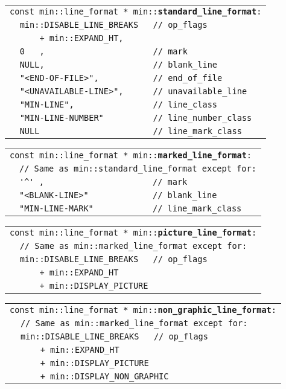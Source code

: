 \documentclass[12pt]{article}
\makeatletter
\newcommand{\TT}[1]{{\tt \bfseries #1}}
\newcommand{\ttindex}[1]{\index{#1@{\tt #1}}}
\newenvironment{indpar}[1][0.3in]%
	{\begin{list}{}%
		     {\setlength{\itemsep}{0in}%
		      \setlength{\topsep}{0in}%
		      \setlength{\parsep}{1ex}%
		      \setlength{\labelwidth}{#1}%
		      \setlength{\leftmargin}{#1}%
		      \addtolength{\leftmargin}{\labelsep}}%
	 \item}%
	{\end{list}}
\newcommand{\LABEL}[1]{\label{#1}}
\newlength{\ARGBREAKLENGTH}
\newcommand{\ARGBREAK}[1][\ARGBREAKLENGTH]{\\&\hspace*{#1}}
\newcommand{\MINKEY}[1]%
	   {\TT{#1}\ttindex{min::#1}\ttindex{#1}}
\makeatother
\begin{document}
\begin{indpar}[1em]\begin{tabular}{rl}
\multicolumn{2}{l}{\tt const min::line\_format *
    min::\MINKEY{standard\_line\_format}:}
\LABEL{MIN::STANDARD_LINE_FORMAT}\ARGBREAK
\verb|min::DISABLE_LINE_BREAKS   // op_flags|\ARGBREAK
\verb|    + min::EXPAND_HT,|\ARGBREAK
\verb|0   ,                      // mark|\ARGBREAK
\verb|NULL,                      // blank_line|\ARGBREAK
\verb|"<END-OF-FILE>",           // end_of_file|\ARGBREAK
\verb|"<UNAVAILABLE-LINE>",      // unavailable_line|\ARGBREAK
\verb|"MIN-LINE",                // line_class|\ARGBREAK
\verb|"MIN-LINE-NUMBER"          // line_number_class|\ARGBREAK
\verb|NULL                       // line_mark_class|
\end{tabular}\end{indpar}

\begin{indpar}[1em]\begin{tabular}{rl}
\multicolumn{2}{l}{\tt const min::line\_format *
    min::\MINKEY{marked\_line\_format}:}
\LABEL{MIN::MARKED_LINE_FORMAT}\ARGBREAK
\verb|// Same as min::standard_line_format except for:|\ARGBREAK
\verb|'^' ,                      // mark|\ARGBREAK
\verb|"<BLANK-LINE>"             // blank_line|\ARGBREAK
\verb|"MIN-LINE-MARK"            // line_mark_class|
\end{tabular}\end{indpar}

\begin{indpar}[1em]\begin{tabular}{rl}
\multicolumn{2}{l}{\tt const min::line\_format *
    min::\MINKEY{picture\_line\_format}:}
\LABEL{MIN::PICTURE_LINE_FORMAT}\ARGBREAK
\verb|// Same as min::marked_line_format except for:|\ARGBREAK
\verb|min::DISABLE_LINE_BREAKS   // op_flags|\ARGBREAK
\verb|    + min::EXPAND_HT|\ARGBREAK
\verb|    + min::DISPLAY_PICTURE|
\end{tabular}\end{indpar}

\begin{indpar}[1em]\begin{tabular}{rl}
\multicolumn{2}{l}{\tt const min::line\_format *
    min::\MINKEY{non\_graphic\_line\_format}:}
\LABEL{MIN::NON_GRAPHIC_LINE_FORMAT}\ARGBREAK
\verb|// Same as min::marked_line_format except for:|\ARGBREAK
\verb|min::DISABLE_LINE_BREAKS   // op_flags|\ARGBREAK
\verb|    + min::EXPAND_HT|\ARGBREAK
\verb|    + min::DISPLAY_PICTURE|\ARGBREAK
\verb|    + min::DISPLAY_NON_GRAPHIC|
\end{tabular}\end{indpar}
\end{document}
